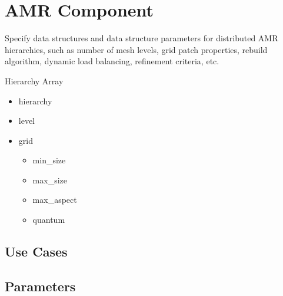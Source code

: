 \section{AMR Component} \label{s:component-amr}

Specify data structures and data structure parameters for distributed
AMR hierarchies, such as number of mesh levels, grid patch properties,
rebuild algorithm, dynamic load balancing, refinement criteria, etc.

Hierarchy
Array


\begin{itemize}
\item hierarchy
\item level
\item grid
\begin{itemize}
\item min\_size
\item max\_size
\item max\_aspect
\item quantum
\end{itemize}
\end{itemize}

\subsection{Use Cases}
\subsection{Parameters}
